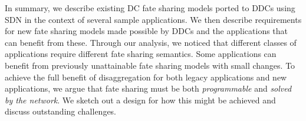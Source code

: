 




In summary, we describe existing DC fate sharing models ported to DDCs using
SDN in the context of several sample applications. We then describe requirements for new
fate sharing models made possible by DDCs and the applications that can benefit
from these. Through our analysis, we noticed that different classes of
applications require different fate sharing semantics. Some
applications can benefit from previously unattainable fate sharing
models with small changes. To achieve the full benefit of disaggregation for
both legacy applications and new applications, we argue that fate sharing must
be both \emph{programmable} and \emph{solved by the network}. We sketch out
a design for how this might be achieved and discuss outstanding challenges.
